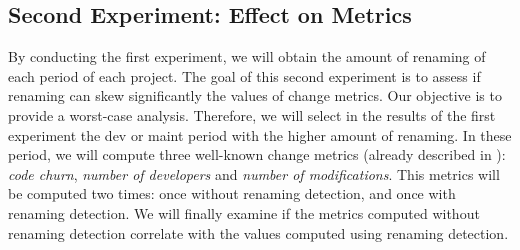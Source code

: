 \subsection{Second Experiment: Effect on Metrics}

By conducting the first experiment, we will obtain the amount of renaming of each period of each project. The goal of this second experiment is to assess if renaming can skew significantly the values of change metrics. Our objective is to provide a worst-case analysis. Therefore, we will select in the results of the first experiment the dev or maint period with the higher amount of renaming. In these period, we will compute three well-known change metrics (already described in ): \emph{code churn}, \emph{number of developers} and \emph{number of modifications}. This metrics will be computed two times: once without renaming detection, and once with renaming detection. We will finally examine if the metrics computed without renaming detection correlate with the values computed using renaming detection.
